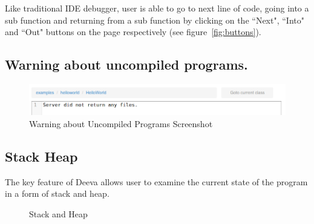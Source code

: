 \documentclass[11pt, a4paper]{article}
\begin{document}
Like traditional IDE debugger, user is able to go to next line of code, going into a sub function and returning from a sub function by clicking on the ``Next", ``Into" and ``Out" buttons on the page respectively (see figure~\ref{fig:buttons}).
\subsection{Warning about uncompiled programs.}
\begin{figure}[h!]
\centering
\includegraphics[scale=0.6]{warningFeature.png}
\caption{Warning about Uncompiled Programs Screenshot}
\label{fig:warningFeature}
\end{figure}

\subsection{Stack Heap}
The key feature of Deeva allows user to examine the current state of the program in a form of stack and heap.
\begin{figure}[h!]
\centering
{}
\quad
{}
\caption{Stack and Heap}
\end{figure}
\end{document}
